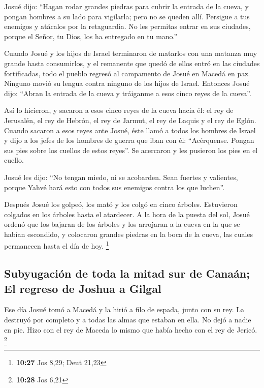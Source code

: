  Josué dijo: ``Hagan rodar grandes piedras para cubrir la
entrada de la cueva, y pongan hombres a su lado para vigilarla;
 pero no se queden allí. Persigue a tus enemigos y
atácalos por la retaguardia. No les permitas entrar en sus ciudades,
porque el Señor, tu Dios, los ha entregado en tu mano.''

 Cuando Josué y los hijos de Israel terminaron de
matarlos con una matanza muy grande hasta consumirlos, y el remanente
que quedó de ellos entró en las ciudades fortificadas, 
todo el pueblo regresó al campamento de Josué en Macedá en paz. Ninguno
movió su lengua contra ninguno de los hijos de Israel. 
Entonces Josué dijo: ``Abran la entrada de la cueva y tráiganme a esos
cinco reyes de la cueva''.

 Así lo hicieron, y sacaron a esos cinco reyes de la
cueva hacia él: el rey de Jerusalén, el rey de Hebrón, el rey de Jarmut,
el rey de Laquis y el rey de Eglón.  Cuando sacaron a
esos reyes ante Josué, éste llamó a todos los hombres de Israel y dijo a
los jefes de los hombres de guerra que iban con él: ``Acérquense. Pongan
sus pies sobre los cuellos de estos reyes''. Se acercaron y les pusieron
los pies en el cuello.

 Josué les dijo: ``No tengan miedo, ni se acobarden. Sean
fuertes y valientes, porque Yahvé hará esto con todos sus enemigos
contra los que luchen''.

 Después Josué los golpeó, los mató y los colgó en cinco
árboles. Estuvieron colgados en los árboles hasta el atardecer.
 A la hora de la puesta del sol, Josué ordenó que los
bajaran de los árboles y los arrojaran a la cueva en la que se habían
escondido, y colocaron grandes piedras en la boca de la cueva, las
cuales permanecen hasta el día de hoy. \footnote{\textbf{10:27} Jos
  8,29; Deut 21,23}

\hypertarget{subyugaciuxf3n-de-toda-la-mitad-sur-de-canauxe1n-el-regreso-de-joshua-a-gilgal}{%
\subsection{Subyugación de toda la mitad sur de Canaán; El regreso de
Joshua a
Gilgal}\label{subyugaciuxf3n-de-toda-la-mitad-sur-de-canauxe1n-el-regreso-de-joshua-a-gilgal}}

 Ese día Josué tomó a Macedá y la hirió a filo de espada,
junto con su rey. La destruyó por completo y a todas las almas que
estaban en ella. No dejó a nadie en pie. Hizo con el rey de Maceda lo
mismo que había hecho con el rey de Jericó. \footnote{\textbf{10:28} Jos
  6,21}

